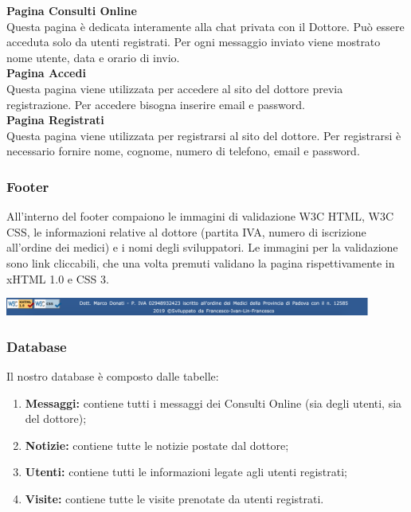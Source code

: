 \textbf{Pagina Consulti Online} \\
Questa pagina è dedicata interamente alla chat privata con il Dottore.
Può essere acceduta solo da utenti registrati.
Per ogni messaggio inviato viene mostrato nome utente, data e orario di invio. \\

\textbf{Pagina Accedi} \\
Questa pagina viene utilizzata per accedere al sito del dottore previa registrazione. Per accedere bisogna inserire email e password. \\

\textbf{Pagina Registrati} \\
Questa pagina viene utilizzata per registrarsi al sito del dottore.  Per registrarsi è necessario fornire nome, cognome, numero di telefono, email e password. \\


\subsubsection{Footer}
All’interno del footer compaiono le immagini di validazione W3C HTML, W3C CSS, le informazioni relative al dottore (partita IVA, numero di iscrizione all’ordine dei medici) e i nomi degli sviluppatori. Le immagini per la validazione sono link cliccabili, che una volta premuti validano la pagina rispettivamente in xHTML 1.0 e CSS 3.

\begin{center}
\includegraphics[width=12cm]{../img/footer}
\end{center}


\subsubsection{Database}
Il nostro database è composto dalle tabelle:
\begin{enumerate}
\item \textbf{Messaggi:} contiene tutti i messaggi dei Consulti Online (sia degli utenti, sia del dottore);
\item \textbf{Notizie:} contiene tutte le notizie postate dal dottore;
\item \textbf{Utenti:} contiene tutti le informazioni legate agli utenti registrati;
\item \textbf{Visite:} contiene tutte le visite prenotate da utenti registrati.
\end{enumerate}
